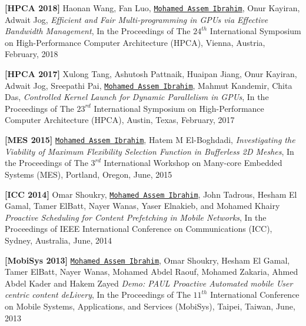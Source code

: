 \documentclass[10pt,a4]{article}
\begin{document}
\begin{description}
\item 
{\bf [HPCA 2018]}
Haonan Wang, Fan Luo, {\tt \underline{Mohamed Assem Ibrahim}}, Onur Kayiran, Adwait Jog, 
{\it Efficient and Fair Multi-programming in GPUs via Effective Bandwidth Management},
In the Proceedings of The $24^{th}$ International Symposium on High-Performance Computer Architecture (HPCA), 
Vienna, Austria, February, 2018


\item 
{\bf [HPCA 2017]}
Xulong Tang, Ashutosh Pattnaik, Huaipan Jiang, Onur Kayiran, Adwait Jog, Sreepathi Pai, {\tt \underline{Mohamed Assem Ibrahim}}, Mahmut Kandemir, Chita Das, 
{\it Controlled Kernel Launch for Dynamic Parallelism in GPUs},
In the Proceedings of The $23^{rd}$ International Symposium on High-Performance Computer Architecture (HPCA), 
Austin, Texas, February, 2017

\item 
{\bf [MES 2015]}
{\tt \underline{Mohamed Assem Ibrahim}}, Hatem M El-Boghdadi,
{\it Investigating the Viability of Maximum Flexibility Selection Function in Bufferless 2D Meshes},
In the Proceedings of The $3^{rd}$ International Workshop on Many-core Embedded Systems (MES), 
Portland, Oregon, June, 2015

\item
{\bf [ICC 2014]} 
Omar Shoukry, {\tt \underline{Mohamed Assem Ibrahim}}, John Tadrous, Hesham El Gamal, Tamer ElBatt, Nayer Wanas, Yaser Elnakieb, and Mohamed Khairy 
{\it Proactive Scheduling for Content Pre­fetching in Mobile Networks}, 
In the Proceedings of IEEE International Conference on Communications (ICC),
Sydney, Australia, June, 2014

\item
{\bf [MobiSys 2013]} 
{\tt \underline{Mohamed Assem Ibrahim}}, Omar Shoukry, Hesham El Gamal, Tamer ElBatt, Nayer Wanas, Mohamed Abdel Raouf, Mohamed Zakaria, Ahmed Abdel Kader and Hakem Zayed 
{\it Demo: PAUL­ Proactive Automated mobile User centric content deLivery}, 
In the Proceedings of The $11^{th}$ International Conference on Mobile Systems, Applications, and Services (MobiSys), 
Taipei, Taiwan, June, 2013

\end{description}
\end{document}
